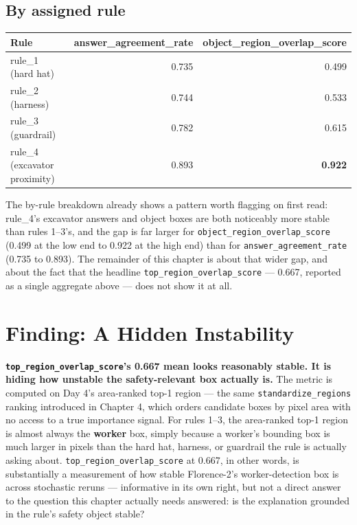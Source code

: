 \subsection{By assigned rule}

\begin{center}
\begin{tabular}{lrr}
\toprule
\textbf{Rule} & \textbf{answer\_agreement\_rate} & \textbf{object\_region\_overlap\_score} \\
\midrule
rule\_1 (hard hat) & 0.735 & 0.499 \\
rule\_2 (harness) & 0.744 & 0.533 \\
rule\_3 (guardrail) & 0.782 & 0.615 \\
rule\_4 (excavator proximity) & 0.893 & \textbf{0.922} \\
\bottomrule
\end{tabular}
\end{center}

The by-rule breakdown already shows a pattern worth flagging on first read: rule\_4's excavator
answers and object boxes are both noticeably more stable than rules 1--3's, and the gap is far
larger for \texttt{object\_region\_overlap\_score} (0.499 at the low end to 0.922 at the high end)
than for \texttt{answer\_agreement\_rate} (0.735 to 0.893). The remainder of this chapter is about
that wider gap, and about the fact that the headline \texttt{top\_region\_overlap\_score} ---
0.667, reported as a single aggregate above --- does not show it at all.

\section{Finding: A Hidden Instability}
\label{sec:day07-finding}

\textbf{\texttt{top\_region\_overlap\_score}'s 0.667 mean looks reasonably stable. It is hiding how
unstable the safety-relevant box actually is.} The metric is computed on Day 4's area-ranked top-1
region --- the same \texttt{standardize\_regions} ranking introduced in Chapter 4, which orders
candidate boxes by pixel area with no access to a true importance signal. For rules 1--3, the
area-ranked top-1 region is almost always the \textbf{worker} box, simply because a worker's
bounding box is much larger in pixels than the hard hat, harness, or guardrail the rule is actually
asking about. \texttt{top\_region\_overlap\_score} at 0.667, in other words, is substantially a
measurement of how stable Florence-2's worker-detection box is across stochastic reruns ---
informative in its own right, but not a direct answer to the question this chapter actually needs
answered: is the explanation grounded in the rule's safety object stable?

